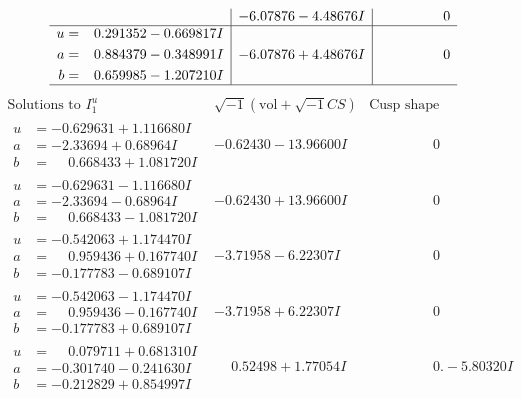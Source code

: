 \documentclass[1p]{elsarticle_modified}
\theoremstyle{definition}
\newcommand{\I}{\sqrt{-1}}
\begin{document}
$$\begin{array}{c|c|c}
 & -6.07876 - 4.48676 I & \phantom{-0.000000 } 0 \\ \hline\begin{aligned}
u &= \phantom{-}0.291352 - 0.669817 I \\
a &= \phantom{-}0.884379 - 0.348991 I \\
b &= \phantom{-}0.659985 - 1.207210 I\end{aligned}
 & -6.07876 + 4.48676 I & \phantom{-0.000000 } 0\\
 \hline 
 \end{array}$$\newpage$$\begin{array}{c|c|c}  
\text{Solutions to }I^u_{1}& \I (\text{vol} + \sqrt{-1}CS) & \text{Cusp shape}\\
 \hline 
\begin{aligned}
u &= -0.629631 + 1.116680 I \\
a &= -2.33694 + 0.68964 I \\
b &= \phantom{-}0.668433 + 1.081720 I\end{aligned}
 & -0.62430 - 13.96600 I & \phantom{-0.000000 } 0 \\ \hline\begin{aligned}
u &= -0.629631 - 1.116680 I \\
a &= -2.33694 - 0.68964 I \\
b &= \phantom{-}0.668433 - 1.081720 I\end{aligned}
 & -0.62430 + 13.96600 I & \phantom{-0.000000 } 0 \\ \hline\begin{aligned}
u &= -0.542063 + 1.174470 I \\
a &= \phantom{-}0.959436 + 0.167740 I \\
b &= -0.177783 - 0.689107 I\end{aligned}
 & -3.71958 - 6.22307 I & \phantom{-0.000000 } 0 \\ \hline\begin{aligned}
u &= -0.542063 - 1.174470 I \\
a &= \phantom{-}0.959436 - 0.167740 I \\
b &= -0.177783 + 0.689107 I\end{aligned}
 & -3.71958 + 6.22307 I & \phantom{-0.000000 } 0 \\ \hline\begin{aligned}
u &= \phantom{-}0.079711 + 0.681310 I \\
a &= -0.301740 - 0.241630 I \\
b &= -0.212829 + 0.854997 I\end{aligned}
 & \phantom{-}0.52498 + 1.77054 I & \phantom{-0.000000 } 0. - 5.80320 I \\ \hline\begin{aligned}

\end{aligned}
\end{array}$$
\end{document}
